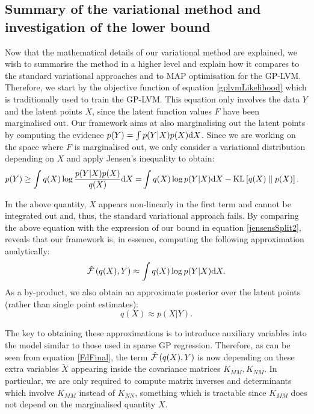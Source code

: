  


\subsection{\label{sec:boundSummary}Summary of the variational method and investigation of the lower bound}

Now that the mathematical details of our variational method are explained,
we wish to summarise the method in a higher level and explain how it
compares to the standard variational approaches and to MAP optimisation for the GP-LVM.
Therefore, we start by the objective function of equation
\eqref{gplvmLikelihood} which is traditionally used to train the GP-LVM.
This equation only involves the data $Y$ and the
latent points $X$, since the latent function values $F$ have been
marginalised out. Our framework aims at also marginalising out
the latent points by computing the evidence
$p(Y) = \int p(Y|X) p(X) \text{d} X$. 
Since we are working on the space where $F$ is marginalised out, we only
consider a variational distribution depending on $X$ and apply Jensen's
inequality to obtain:
\begin{align}
p(Y) \geq \int q(X) \log \frac{p(Y|X)p(X)}{q(X)} \text{d} X 
	= & \int q(X) \log p(Y|X) \text{d} X - \text{KL} \left[ q(X) \parallel p(X) \right] .
\end{align}

In the above quantity, $X$ appears non-linearly in the first term and cannot
be integrated out and, thus, the standard variational approach fails.
By comparing the above equation with the expression of our bound in equation
\eqref{jensensSplit2}, reveals that our framework is, in essence, computing
the following approximation analytically:
\begin{equation}
\label{approxF1}
\hat{\mathcal{F}} \left (q(X), Y \right) \approx \int q(X) \log p(Y|X) \text{d} X .
\end{equation}
As a by-product, we also obtain an approximate posterior over the latent points
(rather than single point estimates):
\begin{equation}
\label{approxF2}
q(X) \approx p(X|Y) .
\end{equation}

The key to obtaining these approximations is to introduce
auxiliary variables into the model similar to those
used in sparse GP regression.
Therefore, as can be seen from equation \eqref{FdFinal},
the term $\hat{\mathcal{F}} \left( q(X), Y \right)$ is now depending on these extra variables
$\tilde{X}$ appearing inside the covariance matrices $K_{MM}, K_{NM}$.
In particular, we are only required to compute matrix inverses and
determinants which involve $K_{MM}$ instead of $K_{NN}$, something which
is tractable since $K_{MM}$ does not depend on the marginalised quantity $X$.

